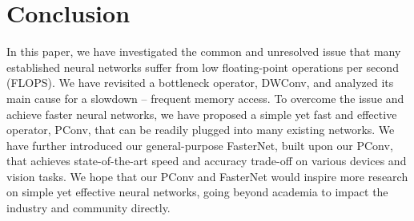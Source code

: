 \section{Conclusion}
\label{sec:conclusion}
In this paper, we have investigated the common and unresolved issue that many established neural networks suffer from low floating-point operations per second (FLOPS). We have revisited a bottleneck operator, DWConv, and analyzed its main cause for a slowdown -- frequent memory access. To overcome the issue and achieve faster neural networks, we have proposed a simple yet fast and effective operator, PConv, that can be readily plugged into many existing networks. We have further introduced our general-purpose FasterNet, built upon our PConv, that achieves state-of-the-art speed and accuracy trade-off on various devices and vision tasks. We hope that our PConv and FasterNet would inspire more research on simple yet effective neural networks, going beyond academia to impact the industry and community directly.


